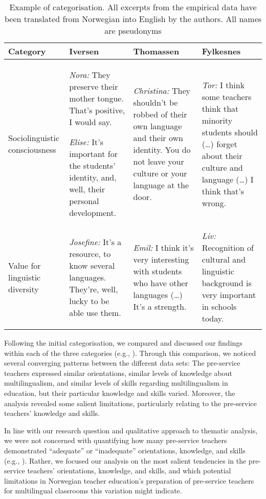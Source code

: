 \documentclass[output=paper]{langscibook}
\begin{document}
\begin{table}
\caption{Example of categorisation. All excerpts from the empirical data have been translated from Norwegian into English by the authors. All names are pseudonyms} 
\label{tab:iversen:2}
\small
\begin{tabularx}{\textwidth}{XQQQ}
\lsptoprule
Category & Iversen & Thomassen & Fylkesnes\\\midrule
Sociolinguistic consciousness & \textit{Nora:} They preserve their mother tongue. That’s positive, I would say. 

\textit{Elise:} It’s important for the students’ identity, and, well, their personal development. & \textit{Christina:} They shouldn’t be robbed of their own language and their own identity. You do not leave your culture or your language at the door. & \textit{Tor:} I think some teachers think that minority students should (…) forget about their culture and language (…) I think that’s wrong. \\
Value for linguistic diversity & \textit{Josefine:} It’s a resource, to know several languages. They’re, well, lucky to be able use them. & \textit{Emil:} I think it’s very interesting with students who have other languages (…) It’s a strength. & \textit{Liv:} Recognition of cultural and linguistic background is very important in schools today.\\
\lspbottomrule
\end{tabularx}
\end{table}

Following the initial categorisation, we compared and discussed our findings within each of the three categories (e.g., \citealt[594--596]{JohnsonChristensen2019}). Through this comparison, we noticed several converging patterns between the different data sets: The pre-service teachers expressed similar orientations, similar levels of knowledge about multilingualism, and similar levels of skills regarding multilingualism in education, but their particular knowledge and skills varied. Moreover, the analysis revealed some salient limitations, particularly relating to the pre-service teachers’ knowledge and skills.

\begin{sloppypar}
In line with our research question and qualitative approach to thematic analysis, we were not concerned with quantifying how many pre-service teachers demonstrated “adequate” or “inadequate” orientations, knowledge, and skills (e.g., \citealt{BrinkmannKvale2015}). Rather, we focused our analysis on the most salient tendencies in the pre-service teachers’ orientations, knowledge, and skills, and which potential limitations in Norwegian teacher education’s preparation of pre-service teachers for multilingual classrooms this variation might indicate.
\end{sloppypar}
\end{document}
